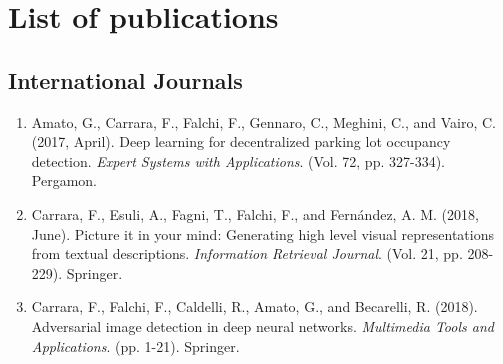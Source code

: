 \chapter*{List of publications}


\section*{International Journals}
\begin{enumerate}
    \item Amato, G., Carrara, F., Falchi, F., Gennaro, C., Meghini, C., and Vairo, C. (2017, April). Deep learning for decentralized parking lot occupancy detection. \emph{Expert Systems with Applications}. (Vol. 72, pp. 327-334). Pergamon.
    \item Carrara, F., Esuli, A., Fagni, T., Falchi, F., and Fernández, A. M. (2018, June). Picture it in your mind: Generating high level visual representations from textual descriptions. \emph{Information Retrieval Journal}. (Vol. 21, pp. 208-229). Springer.
    \item Carrara, F., Falchi, F., Caldelli, R., Amato, G., and Becarelli, R. (2018). Adversarial image detection in deep neural networks. \emph{Multimedia Tools and Applications}. (pp. 1-21). Springer.
\end{enumerate}

